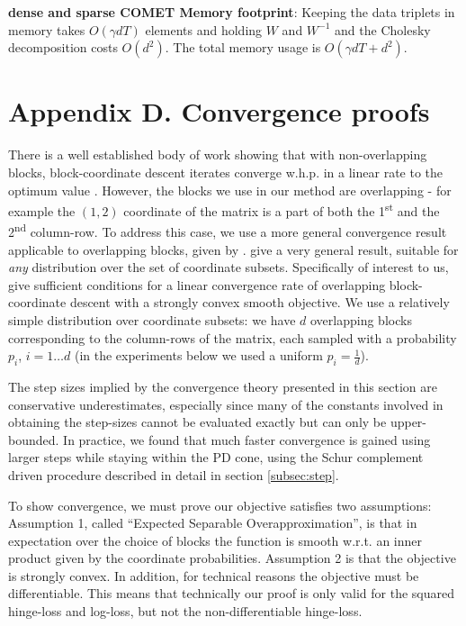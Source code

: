 \documentclass[twoside,11pt]{article}
\newcommand\mat[1]{{#1}}
\newcommand{\W}{\mat{W}}
\begin{document}
{\bf dense and sparse COMET Memory footprint}: Keeping the data triplets in memory takes $O(\gamma d T)$ elements and holding $\W$ and $\W^{-1}$ and the Cholesky decomposition costs $O(d^2)$. The total memory usage is $O(\gamma d T + d^2)$. 

\section*{Appendix D. Convergence proofs}

There is a well established body of work showing that with non-overlapping blocks, block-coordinate descent iterates converge w.h.p. in a linear rate to the optimum value \citep{nesterov2012efficiency,richtarik2014iteration}.
However, the blocks we use in our method are overlapping - for example the $(1,2)$ coordinate of the matrix is a part of both the 1\textsuperscript{st} and the 2\textsuperscript{nd} column-row. To address this case, we use a more general convergence result applicable to overlapping blocks, given by \citet{richtarik2013optimal}. \citeauthor{richtarik2013optimal} give a very general result, suitable for \emph{any} distribution over the set of coordinate subsets. 
Specifically of interest to us, \citeauthor{richtarik2013optimal} give sufficient conditions for a linear convergence rate of overlapping block-coordinate descent with a strongly convex smooth objective. 
We use a relatively simple distribution over coordinate subsets: we have $d$ overlapping blocks corresponding to the column-rows of the matrix, each sampled with a probability $p_i$, $i=1 \ldots d$ (in the experiments below we used a uniform $p_i = \frac{1}{d}$).

The step sizes implied by the convergence theory presented in this section are conservative underestimates, especially since many of the constants involved in obtaining the step-sizes cannot be evaluated exactly but can only be upper-bounded. In practice, we found that much faster convergence is gained using larger steps while staying within the PD cone, using the Schur complement driven procedure described in detail in section \ref{subsec:step}.

To show convergence, we must prove our objective satisfies two assumptions: Assumption 1, called ``Expected Separable Overapproximation'', is that in expectation over the choice of blocks the function is smooth w.r.t. an inner product given by the coordinate probabilities. Assumption 2 is that the objective is strongly convex. In addition, for technical reasons the objective must be differentiable. This means that technically our proof is only valid for the squared hinge-loss and log-loss, but not the non-differentiable hinge-loss.
\end{document}
